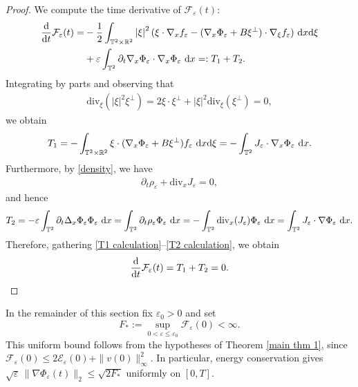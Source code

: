 \documentclass[11pt,reqno]{amsart}
\numberwithin{equation}{section}
\def\dd{{\rm d}}
\begin{document}
\begin{proof}
We compute the time derivative of $\mathcal{F}_{\varepsilon}(t)$: 
\begin{align*}
\frac{\dd}{\dd t}\mathcal{F}_{\varepsilon}(t)=&-\frac{1}{2}\int_{\mathbb{T}^{2}\times \mathbb{R}^{2}}\left\vert \xi\right\vert^{2}(\xi\cdot \nabla_{x}f_{\varepsilon}-(\nabla_{x}\Phi_{\varepsilon}+B\xi^{\perp})\cdot \nabla_{\xi}f_{\varepsilon})  \ \dd x\dd\xi
\\&+\varepsilon\int_{\mathbb{T}^{2}} \partial_{t}\nabla_{x} \Phi_{\varepsilon}\cdot \nabla_{x}\Phi_{\varepsilon}\ \dd x=:T_{1}+T_{2}. 
\end{align*}
Integrating by parts and observing that 
\begin{align*}
\mathrm{div}_{\xi}(\left\vert \xi\right\vert^{2}\xi^{\perp})=2\xi\cdot \xi^{\perp}+\left\vert \xi\right\vert^{2}\mathrm{div}_{\xi}(\xi^{\perp})=0,     
\end{align*}
we obtain 
\begin{align}
T_{1}=-\int_{\mathbb{T}^{2}\times \mathbb{R}^{2}} \xi\cdot (\nabla_{x}\Phi_{\varepsilon}+B\xi^{\perp})f_{\varepsilon}\ \dd x\dd \xi=-\int_{\mathbb{T}^{2}} J_{\varepsilon}\cdot \nabla_{x}\Phi_{\varepsilon}\ \dd x. \label{T1 calculation}  
\end{align}
Furthermore, by \eqref{density}, we have  
\begin{align*}
\partial_{t}\rho_{\varepsilon}+\mathrm{div}_{x}J_{\varepsilon} =0,    
\end{align*}
and hence 
\begin{align}
T_{2}=-\varepsilon\int_{\mathbb{T}^{2}} \partial_{t}\Delta_{x} \Phi_{\varepsilon}\Phi_{\varepsilon}\ \dd x=\int_{\mathbb{T}^{2}} \partial_{t}\rho_{\varepsilon}\Phi_{\varepsilon}\ \dd x=-\int_{\mathbb{T}^{2}} \mathrm{div}_{x}(J_{\varepsilon})\Phi_{\varepsilon}\ \dd x=\int_{\mathbb{T}^{2}} J_{\varepsilon}\cdot \nabla \Phi_{\varepsilon}\ \dd x. \label{T2 calculation}   
\end{align}
Therefore, gathering \eqref{T1 calculation}--\eqref{T2 calculation}, we obtain  
\begin{align}
\frac{\dd}{\dd t}\mathcal{F}_{\varepsilon}(t)=T_{1}+T_{2}=0. \label{T2T4 vanish}    
\end{align}
\end{proof}

In the remainder of this section fix $\varepsilon_{0}>0$ and set
\[
F_{*}:=\sup_{0<\varepsilon\leq\varepsilon_{0}}\mathcal F_{\varepsilon}(0)<\infty.
\]
This uniform bound follows from the hypotheses of Theorem \ref{main thm 1}, since
$\mathcal F_{\varepsilon}(0)\leq 2\mathcal E_{\varepsilon}(0)+\|v(0)\|_{\infty}^{2}$.
In particular, energy conservation gives
$\sqrt\varepsilon\,\|\nabla\Phi_{\varepsilon}(t)\|_{2}\leq\sqrt{2F_{*}}$ uniformly on $[0,T]$.
\end{document}
